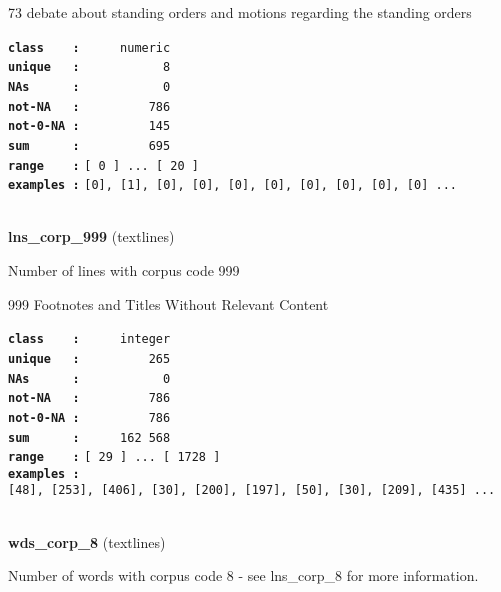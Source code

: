 \documentclass[]{article}
\begin{document}
73 debate about standing orders and motions regarding the standing
orders

\textbf{\texttt{class\ \ \ \ :}} \texttt{~~~~~numeric}\\
\textbf{\texttt{unique\ \ \ :}} \texttt{~~~~~~~~~~~8}\\
\textbf{\texttt{NAs\ \ \ \ \ \ :}} \texttt{~~~~~~~~~~~0}\\
\textbf{\texttt{not-NA\ \ \ :}} \texttt{~~~~~~~~~786}\\
\textbf{\texttt{not-0-NA\ :}} \texttt{~~~~~~~~~145}\\
\textbf{\texttt{sum\ \ \ \ \ \ :}} \texttt{~~~~~~~~~695}\\
\textbf{\texttt{range\ \ \ \ :}}
\texttt{{[}\ 0\ {]}\ ...\ {[}\ 20\ {]}}\\
\textbf{\texttt{examples\ :}}
\texttt{{[}0{]},\ {[}1{]},\ {[}0{]},\ {[}0{]},\ {[}0{]},\ {[}0{]},\ {[}0{]},\ {[}0{]},\ {[}0{]},\ {[}0{]}\ ...}\\

~

\textbf{lns\_corp\_999} (textlines)

Number of lines with corpus code 999

999 Footnotes and Titles Without Relevant Content

\textbf{\texttt{class\ \ \ \ :}} \texttt{~~~~~integer}\\
\textbf{\texttt{unique\ \ \ :}} \texttt{~~~~~~~~~265}\\
\textbf{\texttt{NAs\ \ \ \ \ \ :}} \texttt{~~~~~~~~~~~0}\\
\textbf{\texttt{not-NA\ \ \ :}} \texttt{~~~~~~~~~786}\\
\textbf{\texttt{not-0-NA\ :}} \texttt{~~~~~~~~~786}\\
\textbf{\texttt{sum\ \ \ \ \ \ :}} \texttt{~~~~~162~568}\\
\textbf{\texttt{range\ \ \ \ :}}
\texttt{{[}\ 29\ {]}\ ...\ {[}\ 1728\ {]}}\\
\textbf{\texttt{examples\ :}}
\texttt{{[}48{]},\ {[}253{]},\ {[}406{]},\ {[}30{]},\ {[}200{]},\ {[}197{]},\ {[}50{]},\ {[}30{]},\ {[}209{]},\ {[}435{]}\ ...}\\

~

\textbf{wds\_corp\_8} (textlines)

Number of words with corpus code 8 - see lns\_corp\_8 for more
information.
\end{document}
